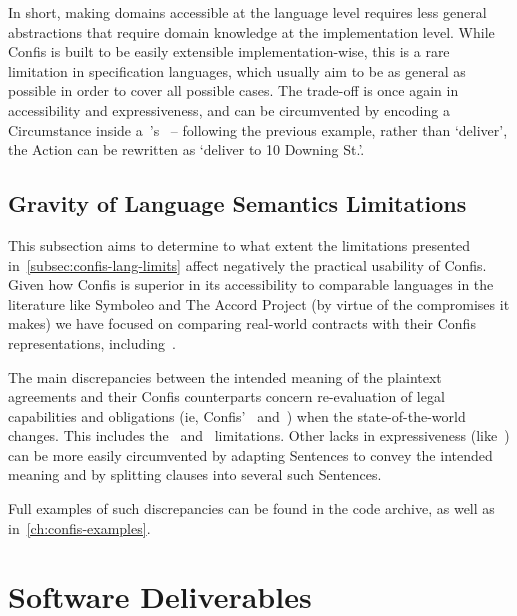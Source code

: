 In short, making domains accessible at the language level requires less general abstractions that require domain knowledge at the implementation level.
While Confis is built to be easily extensible implementation-wise, this is a rare limitation in specification languages, which usually aim to be as general as possible in order to cover all possible cases.
The trade-off is once again in accessibility and expressiveness, and can be circumvented by encoding a Circumstance inside a~'s~ -- following the previous example, rather than `deliver', the Action can be rewritten as `deliver to 10 Downing St.'.

\subsection{Gravity of Language Semantics Limitations}\label{subsec:gravity--lang-limits}

This subsection aims to determine to what extent the limitations presented in~\autoref{subsec:confis-lang-limits} affect negatively the practical usability of Confis.
Given how Confis is superior in its accessibility to comparable languages in the literature like Symboleo and The Accord Project (by virtue of the compromises it makes) we have focused on comparing real-world contracts with their Confis representations, including~\cite{economistIU2016licence, symboleoMeat, jetbrainsToolbox, seismicDataLicence}.

The main discrepancies between the intended meaning of the plaintext agreements and their Confis counterparts concern re-evaluation of legal capabilities and obligations (ie, Confis'~ and~) when the state-of-the-world changes.
This includes the~ and~ limitations.
Other lacks in expressiveness (like~) can be more easily circumvented by adapting Sentences to convey the intended meaning and by splitting clauses into several such Sentences.

Full examples of such discrepancies can be found in the code archive, as well as in~\autoref{ch:confis-examples}.


\section{Software Deliverables}\label{sec:software-deliverables}

